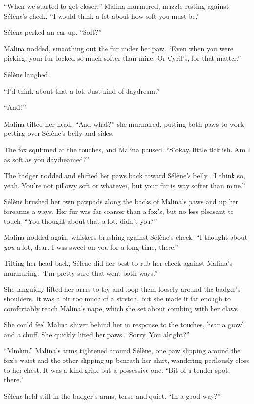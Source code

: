``When we started to get closer,'' Malina murmured, muzzle resting against Sélène's cheek. ``I would think a lot about how soft you must be.''

Sélène perked an ear up. ``Soft?''

Malina nodded, smoothing out the fur under her paw. ``Even when you were picking, your fur looked so much softer than mine. Or Cyril's, for that matter.''

Sélène laughed.

``I'd think about that a lot. Just kind of daydream.''

``And?''

Malina tilted her head. ``And what?'' she murmured, putting both paws to work petting over Sélène's belly and sides.

The fox squirmed at the touches, and Malina paused. ``S'okay, little ticklish. Am I as soft as you daydreamed?''

The badger nodded and shifted her paws back toward Sélène's belly. ``I think so, yeah. You're not pillowy soft or whatever, but your fur is way softer than mine.''

Sélène brushed her own pawpads along the backs of Malina's paws and up her forearms a ways. Her fur was far coarser than a fox's, but no less pleasant to touch. ``You thought about that a lot, didn't you?''

Malina nodded again, whiskers brushing against Sélène's cheek. ``I thought about \emph{you} a lot, dear. I was sweet on you for a long time, there.''

Tilting her head back, Sélène did her best to rub her cheek against Malina's, murmuring, ``I'm pretty sure that went both ways.''

She languidly lifted her arms to try and loop them loosely around the badger's shoulders. It was a bit too much of a stretch, but she made it far enough to comfortably reach Malina's nape, which she set about combing with her claws.

She could feel Malina shiver behind her in response to the touches, hear a growl and a chuff. She quickly lifted her paws. ``Sorry. You alright?''

``Mmhm.'' Malina's arms tightened around Sélène, one paw slipping around the fox's waist and the other slipping up beneath her shirt, wandering perilously close to her chest. It was a kind grip, but a possessive one. ``Bit of a tender spot, there.''

Sélène held still in the badger's arms, tense and quiet. ``In a good way?''

